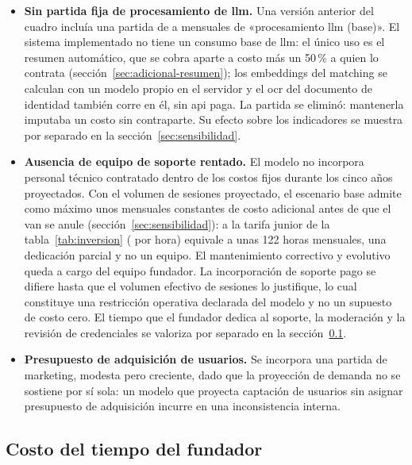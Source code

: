 \begin{itemize}
    \item \textbf{Sin partida fija de procesamiento de \gls{llm}.} Una
          versión anterior del cuadro incluía una partida de
           a  mensuales de «procesamiento \gls{llm}
          (base)». El sistema implementado no tiene un consumo base de
          \gls{llm}: el único uso es el resumen automático, que se cobra
          aparte a costo más un 50\,\% a quien lo contrata
          (sección~\ref{sec:adicional-resumen}); los embeddings del
          \gls{matching} se calculan con un modelo propio en el servidor
          y el \gls{ocr} del documento de identidad también corre en él,
          sin \gls{api} paga. La partida se eliminó: mantenerla
          imputaba un costo sin contraparte. Su efecto sobre los
          indicadores se muestra por separado en la
          sección~\ref{sec:sensibilidad}.
    \item \textbf{Ausencia de equipo de soporte rentado.} El modelo no
          incorpora personal técnico contratado dentro de los costos
          fijos durante los cinco años proyectados. Con el volumen de
          sesiones proyectado, el escenario base admite como máximo unos
           mensuales constantes de costo adicional antes de que
          el \gls{van} se anule (sección~\ref{sec:sensibilidad}): a la
          tarifa junior de la tabla~\ref{tab:inversion} ( por
          hora) equivale a unas 122 horas mensuales, una dedicación parcial
          y no un equipo. El mantenimiento correctivo y evolutivo queda a
          cargo del equipo fundador. La incorporación de soporte pago se
          difiere hasta que el volumen efectivo de sesiones lo justifique,
          lo cual constituye una restricción operativa declarada del
          modelo y no un supuesto de costo cero. El tiempo que el
          fundador dedica al soporte, la moderación y la revisión de
          credenciales se valoriza por separado en la
          sección~\ref{sec:costo-fundador}.
    \item \textbf{Presupuesto de adquisición de usuarios.} Se incorpora
          una partida de marketing, modesta pero creciente, dado que la
          proyección de demanda no se sostiene por sí sola: un modelo que
          proyecta captación de usuarios sin asignar presupuesto de
          adquisición incurre en una inconsistencia interna.
\end{itemize}

\subsection{Costo del tiempo del fundador}\label{sec:costo-fundador}


